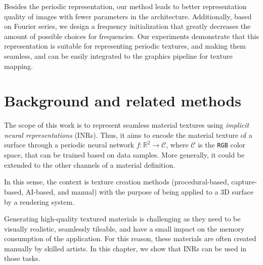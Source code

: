 


Besides the periodic representation, our method leads to better representation quality of images with fewer parameters in the architecture. Additionally, based on Fourier series, we design a frequency initialization that greatly decreases the amount of possible choices for frequencies. 
Our experiments demonstrate that this representation is suitable for representing periodic textures, and making them seamless, and can be easily integrated to the graphics pipeline for texture mapping.


\section{Background and related methods}

The scope of this work is to represent seamless material textures using \textit{implicit neural representations} (INRs). Thus, it aims to encode the material texture of a surface through a periodic neural network $f:\mathbb{R}^2\to \mathcal{C}$, where $\mathcal{C}$ is the \texttt{RGB} color space, that can be trained based on data samples. More generally, it could be extended to the other channels of a material definition.

In this sense, the context is texture creation methods (procedural-based, capture-based, AI-based, and manual) with the purpose of being applied to a 3D surface by a rendering system.

Generating high-quality textured materials is challenging as they need to be visually realistic, seamlessly tileable, and have a small impact on the memory consumption of the application. For this reason, these materials are often created manually by skilled artists. In this chapter, we show that INRs can be used in those tasks.

